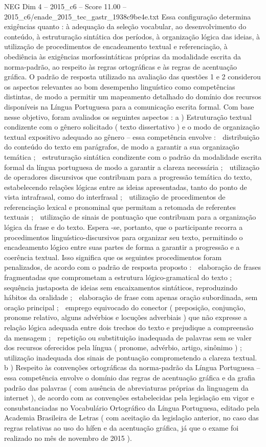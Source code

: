 \begin{textsample}{NEG Dim 4 – 2015\_c6 – Score 11.00 – 2015\_c6/enade\_2015\_tec\_gastr\_1938c9be4e.txt}
Essa configuração determina exigências quanto : à adequação da seleção vocabular, ao desenvolvimento do conteúdo, à estruturação sintática dos períodos, à organização lógica das ideias, à utilização de procedimentos de encadeamento textual e referenciação, à obediência às exigências morfossintáticas próprias da modalidade escrita da norma-padrão, ao respeito às regras ortográficas e às regras de acentuação gráfica.
O padrão de resposta utilizado na avaliação das questões 1 e 2 considerou os aspectos relevantes ao bom desempenho linguístico como competências distintas, de modo a permitir um mapeamento detalhado do domínio dos recursos disponíveis na Língua Portuguesa para a comunicação escrita formal.
Com base nesse objetivo, foram avaliados os seguintes aspectos : a ) Estruturação textual condizente com o gênero solicitado ( texto dissertativo ) e o modo de organização textual expositivo adequado ao gênero – essa competência envolve :  distribuição do conteúdo do texto em parágrafos, de modo a garantir a sua organização temática ;  estruturação sintática condizente com o padrão da modalidade escrita formal da língua portuguesa de modo a garantir a clareza necessária ;  utilização de operadores discursivos que contribuam para a progressão temática do texto, estabelecendo relações lógicas entre as ideias apresentadas, tanto do ponto de vista intrafrasal, como do interfrasal ;  utilização de procedimentos de referenciação lexical e pronominal que permitam a retomada de referentes textuais ;  utilização de sinais de pontuação que contribuam para a organização lógica da frase e do texto.
Espera -se, portanto, que o participante recorra a procedimentos linguístico-discursivos para organizar seu texto, permitindo o encadeamento lógico entre suas partes de forma a garantir a progressão e a coerência textual.
Isso significa que os seguintes procedimentos foram penalizados, de acordo com o padrão de resposta proposto :  elaboração de frases fragmentadas que comprometam a estrutura lógico-gramatical do texto ;  sequência justaposta de ideias sem encaixamentos sintáticos, reproduzindo hábitos da oralidade ;  elaboração de frase com apenas oração subordinada, sem oração principal ;  emprego equivocado do conector ( preposição, conjunção, pronome relativo, alguns advérbios e locuções adverbiais ) que não expresse a relação lógica adequada entre dois trechos do texto e prejudique a compreensão da mensagem ;  repetição ou substituição inadequada de palavras sem se valer dos recursos oferecidos pela língua ( pronome, advérbio, artigo, sinônimo ) ;  utilização inadequada dos sinais de pontuação comprometendo a clareza textual. b ) Respeito às convenções ortográficas da norma-padrão da Língua Portuguesa – essa competência envolve o domínio das regras de acentuação gráfica e da grafia padrão das palavras ( com ausência de abreviaturas próprias da linguagem da internet ), de acordo com as convenções estabelecidas pela legislação em vigor e consubstanciadas no Vocabulário Ortográfico da Língua Portuguesa, editado pela Academia Brasileira de Letras ( com aceitação da legislação anterior, no caso das regras relativas ao uso do hífen e da acentuação gráfica, já que o exame foi realizado no mês de novembro de 2015 ).

\end{textsample}
